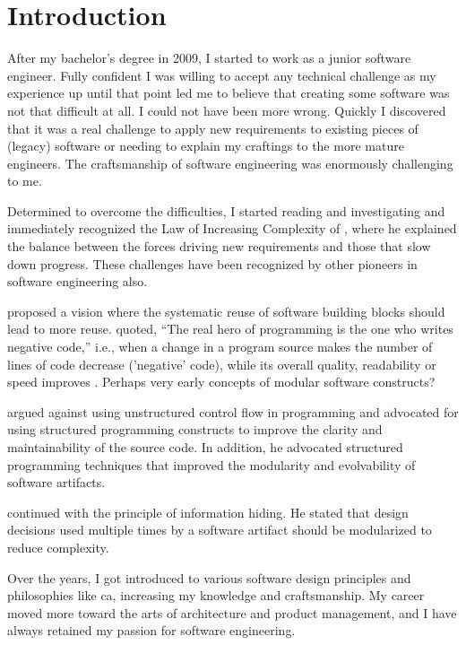 \chapter{Introduction} \label{chap_introduction}

After my bachelor's degree in 2009, I started to work as a junior software engineer. Fully
confident I was willing to accept any technical challenge as my experience up until that
point led me to believe that creating some software was not that difficult at all. I
could not have been more wrong. Quickly I discovered that it was a real challenge to apply
new requirements to existing pieces of (legacy) software or needing to explain my
craftings to the more mature engineers. The craftsmanship of software engineering was
enormously challenging to me.

Determined to overcome the difficulties, I started reading and investigating and
immediately recognized the Law of Increasing Complexity of \textcite{lehman_programs_1980},
where he explained the balance between the forces driving new requirements and those that
slow down progress. These challenges have been recognized by other pioneers in software
engineering also.

\textcite{d_mcilroy_nato_1968} proposed a vision where the systematic reuse of software
building blocks should lead to more reuse. \textcite{d_mcilroy_nato_1968} quoted,
\enquote{The real hero of programming is the one who writes negative code,} i.e., when a
change in a program source makes the number of lines of code decrease ('negative' code),
while its overall quality, readability or speed improves
\parencite{wikipedia_douglas_2023}. Perhaps very early concepts of modular software
constructs?

\textcite{dijkstra_letters_1968} argued against using unstructured control flow in
programming and advocated for using structured programming constructs to improve the
clarity and maintainability of the source code. In addition, he advocated structured
programming techniques that improved the modularity and evolvability of software
artifacts.

\textcite{parnas_criteria_1972} continued with the principle of information hiding. He
stated that design decisions used multiple times by a software artifact should be
modularized to reduce complexity. 

Over the years, I got introduced to various software design principles and philosophies
like \gls{ca}, increasing my knowledge and craftsmanship. My career moved more toward the
arts of architecture and product management, and I have always retained my passion for
software engineering.

